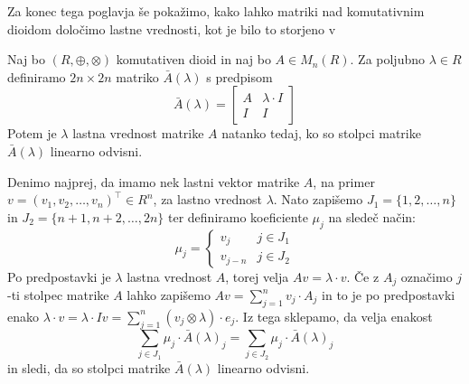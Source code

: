 \documentclass[mat1]{fmfdelo}
\begin{document}
Za konec tega poglavja še pokažimo, kako lahko matriki nad komutativnim dioidom določimo lastne vrednosti, kot je bilo to storjeno v \cite[poglavje 6, izrek 6]{bib:Gondran}

\begin{izrek}
Naj bo $(R, \oplus, \otimes)$ komutativen dioid in naj bo $A\in M_n(R)$. Za poljubno $\lambda \in R$ definiramo $2n\times 2n$ matriko $\bar{A}(\lambda)$ s predpisom $$\bar{A}(\lambda) = \begin{bmatrix}
	A & \lambda\cdot I \\
	I & I
\end{bmatrix}$$
Potem je $\lambda$ lastna vrednost matrike $A$ natanko tedaj, ko so stolpci matrike $\bar{A}(\lambda)$ linearno odvisni.
\end{izrek}
\begin{dokaz}
	Denimo najprej, da imamo nek lastni vektor matrike $A$, na primer $v = (v_1, v_2, \ldots, v_n)^\top\in R^n$, za lastno vrednost $\lambda$. Nato zapišemo $J_1 = \{1, 2, \ldots, n\}$ in $J_2 = \{n+1, n+2, \ldots, 2n\}$ ter definiramo koeficiente $\mu_j$ na sledeč način: $$\mu_j = \begin{cases}
		v_j & j\in J_1 \\
		v_{j-n} & j\in J_2
	\end{cases}$$
	Po predpostavki je $\lambda$ lastna vrednost $A$, torej velja $Av = \lambda\cdot v$. Če z $A_j$ označimo $j$-ti stolpec matrike $A$ lahko zapišemo $Av = \sum_{j = 1}^{n} v_j \cdot A_j$ in to je po predpostavki enako $\lambda\cdot v = \lambda \cdot Iv = \sum_{j = 1}^{n}(v_j \otimes \lambda ) \cdot e_j$. Iz tega sklepamo, da velja enakost \begin{equation} \label{eq:eigendep}
		\sum_{j\in J_1}\mu_j \cdot \bar{A}(\lambda)_j = \sum_{j\in J_2}\mu_j \cdot \bar{A}(\lambda)_j
	\end{equation} in sledi, da so stolpci matrike $\bar{A}(\lambda)$ linearno odvisni.
	

\end{dokaz}
\end{document}
